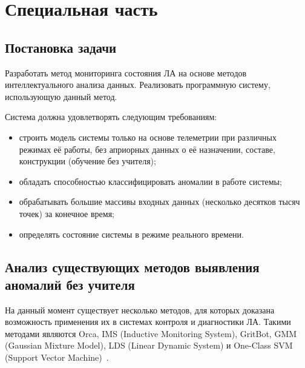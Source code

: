 \chapter{Специальная часть}
\section{Постановка задачи}
Разработать метод мониторинга состояния ЛА на основе методов интеллектуального анализа данных. Реализовать программную систему, использующую данный метод.

Система должна удовлетворять следующим требованиям:
\begin{itemize}
	\item строить модель системы только на основе телеметрии при различных режимах её работы, без априорных данных о её назначении, составе, конструкции (обучение без учителя);
	\item обладать способностью классифицировать аномалии в работе системы;
	\item обрабатывать большие массивы входных данных (несколько десятков тысяч точек) за конечное время;
	\item определять состояние системы в режиме реального времени.
\end{itemize}

\section{Анализ существующих методов выявления аномалий без учителя}
На данный момент существует несколько методов, для которых доказана возможность применения их в системах контроля и диагностики ЛА. Такими методами являются Orca, IMS (Inductive Monitoring System), GritBot, GMM (Gaussian Mixture Model), LDS (Linear Dynamic System) и One-Class SVM (Support Vector Machine)~\cite{MartinCompUnsupervisedDetectionMethods}.



